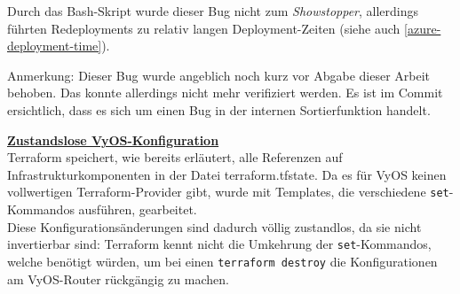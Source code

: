Durch das Bash-Skript wurde dieser Bug nicht zum \textit{Showstopper}, allerdings führten Redeployments zu relativ langen Deployment-Zeiten (siehe auch \ref{azure-deployment-time}).

Anmerkung: Dieser Bug wurde angeblich noch kurz vor Abgabe dieser Arbeit behoben. Das konnte allerdings nicht mehr verifiziert werden. Es ist im Commit ersichtlich, dass es sich um einen Bug in der internen Sortierfunktion handelt.\cite{awsfixtf2021}

\textbf{\underline{Zustandslose VyOS-Konfiguration}}\\
Terraform speichert, wie bereits erläutert, alle Referenzen auf Infrastrukturkomponenten in der Datei terraform.tfstate. Da es für VyOS keinen vollwertigen Terraform-Provider gibt, wurde mit Templates, die verschiedene \texttt{set}-Kommandos ausführen, gearbeitet.\\
Diese Konfigurationsänderungen sind dadurch völlig zustandlos, da sie nicht invertierbar sind: Terraform kennt nicht die Umkehrung der \texttt{set}-Kommandos, welche benötigt würden, um bei einen \texttt{terraform destroy} die Konfigurationen am VyOS-Router rückgängig zu machen.

